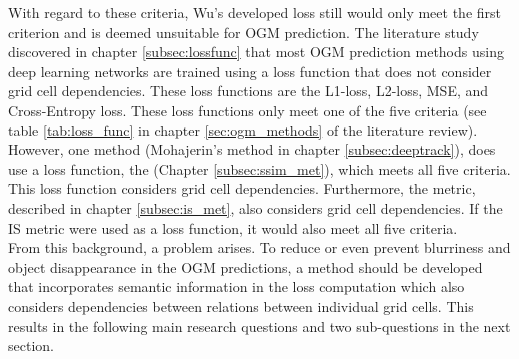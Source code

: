 With regard to these criteria, Wu's \cite{wu2020motionnet} developed loss still would only meet the first criterion and is deemed unsuitable for \gls{OGM} prediction. The literature study discovered in chapter \ref{subsec:lossfunc} that most \gls{OGM} prediction methods using deep learning networks are trained using a loss function that does not consider grid cell dependencies. These loss functions are the L1-loss, L2-loss, \gls{MSE}, and Cross-Entropy loss. These loss functions only meet one of the five criteria (see table \ref{tab:loss_func} in chapter \ref{sec:ogm_methods} of the literature review). However, one method (Mohajerin's \cite{mohajerin2019multi} method in chapter \ref{subsec:deeptrack}), does use a loss function, the  (Chapter \ref{subsec:ssim_met}), which meets all five criteria. This loss function considers grid cell dependencies. Furthermore, the  metric, described in chapter \ref{subsec:is_met}, also considers grid cell dependencies. If the \gls{IS} metric were used as a loss function, it would also meet all five criteria. \\

From this background, a problem arises. To reduce or even prevent blurriness and object disappearance in the \gls{OGM} predictions, a method should be developed that incorporates semantic information in the loss computation which also considers dependencies between relations between individual grid cells. This results in the following main research questions and two sub-questions in the next section. 



